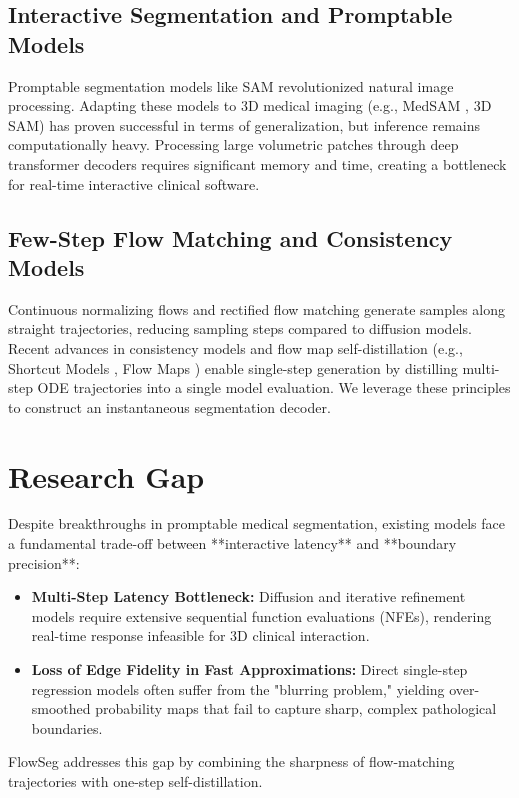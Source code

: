 \documentclass[10.1005,journal]{IEEEtran}
\begin{document}
\subsection{Interactive Segmentation and Promptable Models}
Promptable segmentation models like SAM revolutionized natural image processing. Adapting these models to 3D medical imaging (e.g., MedSAM \cite{ma2024segment}, 3D SAM) has proven successful in terms of generalization, but inference remains computationally heavy. Processing large volumetric patches through deep transformer decoders requires significant memory and time, creating a bottleneck for real-time interactive clinical software.

\subsection{Few-Step Flow Matching and Consistency Models}
Continuous normalizing flows and rectified flow matching \cite{lipman2023flow, liu2023flow} generate samples along straight trajectories, reducing sampling steps compared to diffusion models. Recent advances in consistency models and flow map self-distillation (e.g., Shortcut Models \cite{frans2025one}, Flow Maps \cite{boffi2025how}) enable single-step generation by distilling multi-step ODE trajectories into a single model evaluation. We leverage these principles to construct an instantaneous segmentation decoder.

\section{Research Gap}
Despite breakthroughs in promptable medical segmentation, existing models face a fundamental trade-off between **interactive latency** and **boundary precision**:
\begin{itemize}
    \item \textbf{Multi-Step Latency Bottleneck:} Diffusion and iterative refinement models require extensive sequential function evaluations (NFEs), rendering real-time response infeasible for 3D clinical interaction.
    \item \textbf{Loss of Edge Fidelity in Fast Approximations:} Direct single-step regression models often suffer from the "blurring problem," yielding over-smoothed probability maps that fail to capture sharp, complex pathological boundaries.
\end{itemize}
FlowSeg addresses this gap by combining the sharpness of flow-matching trajectories with one-step self-distillation.
\end{document}
